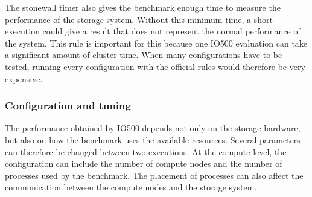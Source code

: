 The stonewall timer also gives the benchmark enough time to measure the
performance of the storage system. Without this minimum time, a short
execution could give a result that does not represent the normal
performance of the system. This rule is important for this  because one IO500 evaluation
can take a significant amount of cluster time. When many configurations
have to be tested, running every configuration with the official rules
would therefore be very expensive.






\subsubsection{Configuration and tuning}

The performance obtained by IO500 depends not only on the storage
hardware, but also on how the benchmark uses the available resources.
Several parameters can therefore be changed between two executions. At the compute level, the configuration can include the number of
compute nodes and the number of processes used by the benchmark. The
placement of processes can also affect the communication between the
compute nodes and the storage system.

